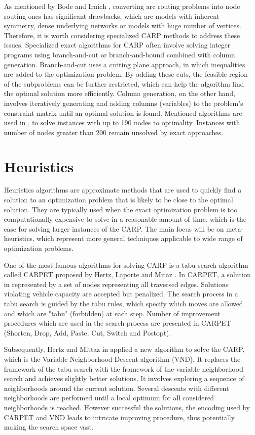 \documentclass[twoside]{ctuthesis}
\theoremstyle{plain}
\theoremstyle{definition}
\theoremstyle{note}
\begin{document}
As mentioned by Bode and Irnich \cite{bode2012cut}, converting arc routing problems into node routing ones has significant drawbacks, which are models with inherent symmetry, dense underlying networks or models with huge number of vertices. Therefore, it is worth considering specialized CARP methods to address these issues. 
Specialized exact algorithms for CARP often involve solving integer programs using branch-and-cut or branch-and-bound combined with column generation. Branch-and-cut uses a cutting plane approach, in which inequalities are added to the optimization problem.  By adding these cuts, the feasible region of the subproblems can be further restricted, which can help the algorithm find the optimal solution more efficiently. Column generation, on the other hand, involves iteratively generating and adding columns (variables) to the problem's constraint matrix until an optimal solution is found. Mentioned algorithms are used in \cite{bode2012cut}, \cite{bartolini2013improved} to solve instances with up to 190 nodes to optimality. Instances with number of nodes greater than 200 remain unsolved by exact approaches. 

\section{Heuristics}
Heuristics algorithms are approximate methods that are used to quickly find a solution to an optimization problem that is likely to be close to the optimal solution. They are typically used when the exact optimization problem is too computationally expensive to solve in a reasonable amount of time, which is the case for solving larger instances of the CARP. The main focus will be on meta-heuristics, which represent more general techniques applicable to wide range of optimization problems.

One of the most famous algorithms for solving CARP is a tabu search algorithm called CARPET proposed by Hertz, Laporte and Mitaz \cite{hertz2000tabu}. In CARPET, a solution in represented by a set of nodes representing all traversed edges. Solutions violating vehicle capacity are accepted but penalized. The search process in a tabu search is guided by the tabu rules, which specify which moves are allowed and which are "tabu" (forbidden) at each step. Number of improvement procedures which are used in the search process are presented in CARPET (Shorten, Drop, Add, Paste, Cut, Switch and Postopt).

Subsequently, Hertz and Mittaz in \cite{hertz2001variable} applied a new algorithm to solve the CARP, which is the Variable Neighborhood Descent algorithm (VND). It replaces the framework of the tabu search with the framework of the variable neighborhood search and achieves slightly better solutions. It involves exploring a sequence of neighborhoods around the current solution. Several descents with different neighborhoods are performed until a local optimum for all considered neighborhoods is reached. However successful the solutions, the encoding used by CARPET and VND leads to intricate improving procedure, thus potentially making the search space vast.
\end{document}
